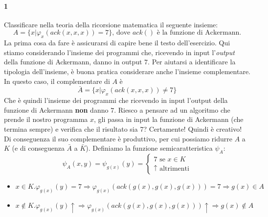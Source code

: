 \documentclass[a4paper,oneside]{scrbook}
\begin{document}
\paragraph{1} Classificare nella teoria della ricorsione matematica il seguente insieme:
\begin{equation*}
	A=\{x|\varphi_x(ack(x,x,x))=7\} \text{, dove $ack()$ è la funzione di Ackermann.}
\end{equation*}
La prima cosa da fare è assicurarsi di capire bene il testo dell'esercizio.
Qui stiamo considerando l'insieme dei programmi che, ricevendo in input l'\textit{output} della funzione di Ackermann, danno in output $7$.
Per aiutarsi a identificare la tipologia dell'insieme, è buona pratica considerare anche l'insieme complementare. In questo caso, il complementare di $A$ è
$$\bar{A}=\{x|\varphi_x(ack(x,x,x))\ne 7\}$$
Che è quindi l'insieme dei programmi che ricevendo in input l'output della funzione di Ackermann \textbf{non} danno $7$.
Riesco a pensare ad un algoritmo che prende il nostro programma $x$, gli passa in input la funzione di Ackermann (che termina sempre) e verifica che il risultato sia 7?
Certamente! Quindi è creativo! Di conseguenza il suo complementare è produttivo, per cui possiamo ridurre $A$ a $K$ (e di conseguenza $\bar{A}$ a $\bar{K}$).
Definiamo la funzione semicaratteristica $\psi_A$:
\begin{equation*}
	\psi_A(x,y)=
	\psi_{g(x)}(y)=
	\begin{cases}
		7 \text{ se } x \in K\\
		\uparrow \text{ altrimenti}
	\end{cases}
\end{equation*}
\begin{itemize}
	\item $x\in K.\varphi_{g(x)}(y)=7 \Rightarrow \varphi_{g(x)}(ack(g(x),g(x),g(x)))=7 \Rightarrow g(x) \in A$
	\item $x\notin K.\varphi_{g(x)}(y)\uparrow \Rightarrow \varphi_{g(x)}(ack(g(x),g(x),g(x)))\uparrow \Rightarrow g(x) \notin A$ 
\end{itemize}
\end{document}
